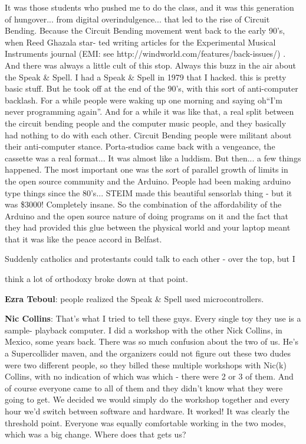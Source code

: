 It was those students who pushed me to do the class, and it was this generation of hungover... from digital overindulgence... that led to the rise of Circuit Bending. Because the Circuit Bending movement went back to the early 90’s, when Reed Ghazala star- ted writing articles for the Experimental Musical Instruments journal (EMI: see http://windworld.com/features/back-issues/) . And there was always a little cult of this stop. Always this buzz in the air about the Speak & Spell. I had a Speak & Spell in 1979 that I hacked. this is pretty basic stuff. But he took off at the end of the 90’s, with this sort of anti-computer backlash. For a while people were waking up one morning and saying oh``I’m never programming again''. And for a while it was like that, a real split between the circuit bending people and the computer music people, and they basically had nothing to do with each other. Circuit Bending people were militant about their anti-computer stance. Porta-studios came back with a vengeance, the cassette was a real format... It was almost like a luddism. But then... a few things happened. The most important one was the sort of parallel growth of limits in the open source community and the Arduino.   People had been making arduino type things since the 80’s... STEIM made this beautiful sensorlab thing - but it was \$3000! Completely insane. So the combination of the affordability of the Arduino and the open source nature of doing programs on it and the fact that they had provided this glue between the physical world and your laptop meant that it was like the peace accord in Belfast.
				

Suddenly catholics and protestants could talk to each other - over the top, but I
					
think a lot of orthodoxy broke down at that point.
					
\textbf{Ezra Teboul}: people realized the Speak & Spell used microcontrollers.
					
\textbf{Nic Collins}: That’s what I tried to tell these guys. Every single toy they use is a sample- playback computer. I did a workshop with the other Nick Collins, in Mexico, some years back. There was so much confusion about the two of us. He’s a Supercollider maven, and the organizers could not figure out these two dudes were two different people, so they billed these multiple workshops with Nic(k) Collins, with no indication of which was which - there were 2 or 3 of them. And of course everyone came to all of them and they didn’t know what they were going to get. We decided we would simply do the workshop together and every hour we’d switch between software and hardware. It worked! It was clearly the threshold point. Everyone was equally comfortable working in the two modes, which was a big change. Where does that gets us?
					
